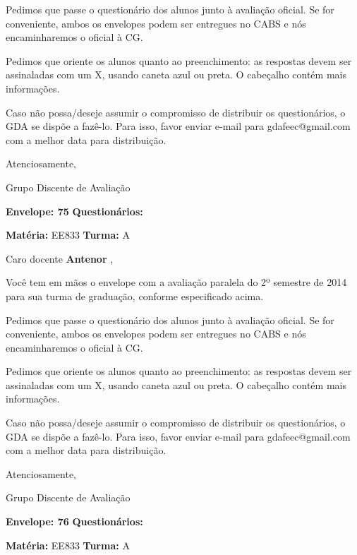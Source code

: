 \documentclass[a5paper]{letter}
\begin{document}
	Pedimos que passe o questionário dos alunos junto à avaliação oficial. Se for conveniente, ambos os envelopes podem ser entregues no CABS e nós encaminharemos o oficial à CG.

Pedimos que oriente os alunos quanto ao preenchimento: as respostas devem ser assinaladas com um X, usando caneta azul ou preta. O cabeçalho contém mais informações.

	Caso não possa/deseje assumir o compromisso de distribuir os questionários, o GDA se dispõe a fazê-lo. Para isso, favor enviar e-mail para gdafeec@gmail.com com a melhor data para distribuição.


Atenciosamente, 

Grupo Discente de Avaliação

\vspace{0.5cm}

{\bf Envelope: 75 }		\hfill	{\bf Questionários:} \hspace{2cm}

\newpage
\thispagestyle{empty}

\hfill {\bf Matéria:} EE833 {\bf Turma:} A

Caro docente {\bf Antenor }, 

	Você tem em mãos o envelope com a avaliação paralela do 2º semestre de 2014 para sua turma de graduação, conforme especificado acima.

	Pedimos que passe o questionário dos alunos junto à avaliação oficial. Se for conveniente, ambos os envelopes podem ser entregues no CABS e nós encaminharemos o oficial à CG.

Pedimos que oriente os alunos quanto ao preenchimento: as respostas devem ser assinaladas com um X, usando caneta azul ou preta. O cabeçalho contém mais informações.

	Caso não possa/deseje assumir o compromisso de distribuir os questionários, o GDA se dispõe a fazê-lo. Para isso, favor enviar e-mail para gdafeec@gmail.com com a melhor data para distribuição.


Atenciosamente, 

Grupo Discente de Avaliação

\vspace{0.5cm}

{\bf Envelope: 76 }		\hfill	{\bf Questionários:} \hspace{2cm}

\newpage
\thispagestyle{empty}

\hfill {\bf Matéria:} EE833 {\bf Turma:} A
\end{document}
